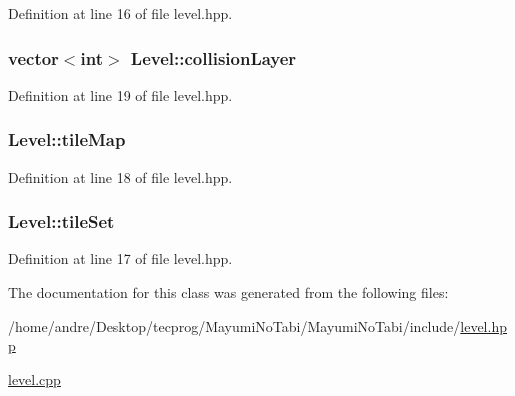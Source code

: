 Definition at line 16 of file level.\-hpp.

\hypertarget{class_level_a7d876c4662341efdf8fd69b23fcbf93e}{
\subsubsection[{collision\-Layer}]{\setlength{\rightskip}{0pt plus 5cm}vector$<${\bf int}$>$ Level\-::collision\-Layer}}\label{class_level_a7d876c4662341efdf8fd69b23fcbf93e}


Definition at line 19 of file level.\-hpp.

\hypertarget{class_level_a7b9f6b7e5b8f9fb86af29acc9ed11101}{
\subsubsection[{tile\-Map}]{ Level\-::tile\-Map}}\label{class_level_a7b9f6b7e5b8f9fb86af29acc9ed11101}


Definition at line 18 of file level.\-hpp.

\hypertarget{class_level_a7a2b84517f9a148ec9ddf13d8dc7f7d6}{
\subsubsection[{tile\-Set}]{ Level\-::tile\-Set}}\label{class_level_a7a2b84517f9a148ec9ddf13d8dc7f7d6}


Definition at line 17 of file level.\-hpp.



The documentation for this class was generated from the following files\-:\begin{DoxyCompactItemize}
\item 
/home/andre/\-Desktop/tecprog/\-Mayumi\-No\-Tabi/\-Mayumi\-No\-Tabi/include/\hyperlink{level_8hpp}{level.\-hpp}\item 
\hyperlink{level_8cpp}{level.\-cpp}\end{DoxyCompactItemize}
